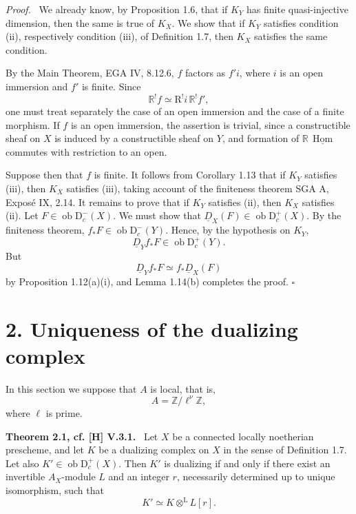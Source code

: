 \documentclass[11pt]{article}
\providecommand{\qedtext}{\hfill$\square$}
\providecommand{\ZZ}{\mathbb{Z}}
\newenvironment{statement}[1]{\par\medskip\noindent\textbf{#1.}\ }{\par\medskip}
\newenvironment{prooftext}[1][Proof]{\par\noindent\emph{#1.}\ }{\par\medskip}
\DeclareMathOperator{\Hom}{Hom}
\newcommand{\R}{\mathrm{R}}
\newcommand{\D}{\mathrm{D}}
\newcommand{\ob}{\operatorname{ob}}
\providecommand{\Hom}{\operatorname{Hom}}
\providecommand{\ob}{\operatorname{ob}}
\providecommand{\R}{\mathrm R}
\providecommand{\Hom}{\operatorname{Hom}}
\providecommand{\qedtext}{\hfill$\square$}
\begin{document}
\begin{prooftext}
We already know, by Proposition 1.6, that if $K_Y$ has finite quasi-injective dimension, then the same is true of $K_X$. We show that if $K_Y$ satisfies condition (ii), respectively condition (iii), of Definition 1.7, then $K_X$ satisfies the same condition.

By the Main Theorem, EGA IV, 8.12.6, $f$ factors as $f'i$, where $i$ is an open immersion and $f'$ is finite. Since
\[
   \mathbb{R}^!f\simeq\R^!i\,\mathbb{R}^!f',
\]
one must treat separately the case of an open immersion and the case of a finite morphism. If $f$ is an open immersion, the assertion is trivial, since a constructible sheaf on $X$ is induced by a constructible sheaf on $Y$, and formation of $\mathbb{R}\,\underline{\Hom}$ commutes with restriction to an open.

Suppose then that $f$ is finite. It follows from Corollary 1.13 that if $K_Y$ satisfies (iii), then $K_X$ satisfies (iii), taking account of the finiteness theorem SGA A, Exposé IX, 2.14. It remains to prove that if $K_Y$ satisfies (ii), then $K_X$ satisfies (ii). Let $F\in\ob\D_c^-(X)$. We must show that $\underline D_X(F)\in\ob\D_c^+(X)$. By the finiteness theorem, $f_*F\in\ob\D_c^-(Y)$. Hence, by the hypothesis on $K_Y$,
\[
   \underline D_Y f_*F\in\ob\D_c^+(Y).
\]
But
\[
   \underline D_Y f_*F\simeq f_*\underline D_X(F)
\]
by Proposition 1.12(a)(i), and Lemma 1.14(b) completes the proof. \qedtext
\end{prooftext}



\section*{2. Uniqueness of the dualizing complex}

In this section we suppose that $A$ is local, that is,
\[
   A=\ZZ/\ell^\nu\ZZ,
\]
where $\ell$ is prime.

\begin{statement}{Theorem 2.1, cf. [H] V.3.1}
Let $X$ be a connected locally noetherian prescheme, and let $K$ be a dualizing complex on $X$ in the sense of Definition 1.7. Let also $K'\in\ob\D_c^+(X)$. Then $K'$ is dualizing if and only if there exist an invertible $A_X$-module $L$ and an integer $r$, necessarily determined up to unique isomorphism, such that
\[
   K'\simeq K\otimes^{\mathrm L}L[r].
\]
\end{statement}
\end{document}
